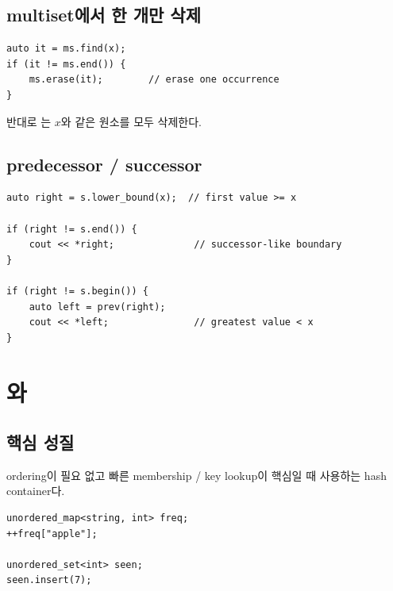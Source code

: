 \subsection{multiset에서 한 개만 삭제}
\begin{lstlisting}
auto it = ms.find(x);
if (it != ms.end()) {
    ms.erase(it);        // erase one occurrence
}
\end{lstlisting}

반대로 는 $x$와 같은 원소를 모두 삭제한다.

\subsection{predecessor / successor}
\begin{lstlisting}
auto right = s.lower_bound(x);  // first value >= x

if (right != s.end()) {
    cout << *right;              // successor-like boundary
}

if (right != s.begin()) {
    auto left = prev(right);
    cout << *left;               // greatest value < x
}
\end{lstlisting}

\section{와 }
\subsection{핵심 성질}
ordering이 필요 없고 빠른 membership / key lookup이 핵심일 때 사용하는 hash container다.

\begin{lstlisting}
unordered_map<string, int> freq;
++freq["apple"];

unordered_set<int> seen;
seen.insert(7);
\end{lstlisting}

